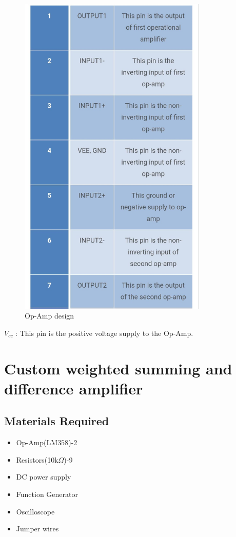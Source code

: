 \documentclass[a4paper,12pt]{article}
\begin{document}
\begin{figure}[H]
    \centering
	\includegraphics[width=0.8\textwidth]{fig/p.jpeg} %
    \caption{Op-Amp design}
    \label{fig:image_label}
\end{figure}
$V_{cc}$ : This pin is the positive voltage supply to the Op-Amp.

\section{Custom weighted summing and difference amplifier}

\subsection{Materials Required}
\begin{itemize}
    \item Op-Amp(LM$358$)-2
    \item Resistors(10k$\Omega$)-9
    \item DC power supply
    \item Function Generator
    \item Oscilloscope
    \item Jumper wires
\end{itemize}
\end{document}
